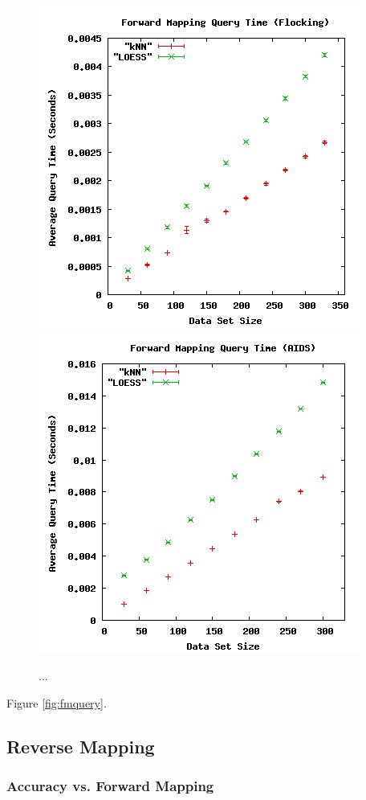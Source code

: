 \begin{figure}[ht]
\centering
\includegraphics[scale=.4]{images/results_flocking/fmquery.png}
\includegraphics[scale=.4]{images/results_aids/aids-fmquery.png}
\caption{...}
\label{fig:flockfmquery}
\end{figure}

Figure \ref{fig:fmquery}.


 \subsection{Reverse Mapping}

  \subsubsection{Accuracy vs. Forward Mapping}

